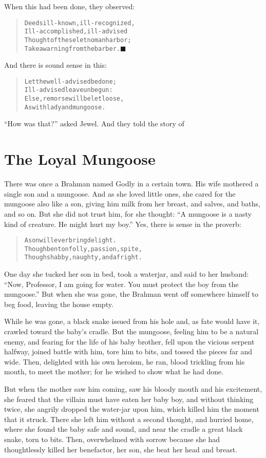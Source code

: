 \documentclass[article, twoside, 14pt]{memoir}
\newcommand{\qed}{\hfill \ensuremath{\blacksquare}}
\renewenvironment{verbatim}{%
\begin{quote}%
\vskip -10pt%
\begin{alltt}\normalfont\large}{\end{alltt}%
\end{quote}%
\vskip -10pt
} %
\begin{document}
When this had been done, they observed:

\begin{verbatim}
Deeds ill-known, ill-recognized,
Ill-accomplished, ill-advised{\textemdash}
Thought of these let no man harbor;
Take a warning from the barber.\hyperref[s79]{\qed}
\end{verbatim}
And there is sound sense in this:

\begin{verbatim}
Let the well-advised be done;
Ill-advised leave unbegun:
Else, remorse will be let loose,
As with lady and mungoose.
\end{verbatim}
``How was that?'' asked Jewel. And they told the story of

\chapter{The Loyal Mungoose}

\label{s80}

There was once a Brahman named Godly in a certain town. His wife
mothered a single son and a mungoose. And as she loved little ones,
she cared for the mungoose also like a son, giving him milk
from her breast, and salves, and baths, and so on. But she did not
trust him, for she thought:
``A mungoose is a nasty kind of creature. He might hurt my boy.''
Yes, there is sense in the proverb:

\begin{verbatim}
A son will ever bring delight.
Though bent on folly, passion, spite,
Though shabby, naughty, and a fright.
\end{verbatim}
One day she tucked her son in bed, took a waterjar, and said to her
husband:
``Now, Professor, I am going for water. You must protect the boy from the mungoose.''
But when she was gone, the Brahman went off somewhere himself to
beg food, leaving the house empty.

While he was gone, a black snake issued from his hole and, as fate
would have it, crawled toward the baby's cradle. But the mungoose,
feeling him to be a natural enemy, and fearing for the life of his
baby brother, fell upon the vicious serpent halfway, joined battle
with him, tore him to bits, and tossed the pieces far and wide.
Then, delighted with his own heroism, he ran, blood trickling from
his mouth, to meet the mother; for he wished to show what he had
done.

But when the mother saw him coming, saw his bloody mouth and his
excitement, she feared that the villain must have eaten her baby
boy, and without thinking twice, she angrily dropped the water-jar
upon him, which killed him the moment that it struck. There she
left him without a second thought, and hurried home, where she
found the baby safe and sound, and near the cradle a great black
snake, torn to bits. Then, overwhelmed with sorrow because she had
thoughtlessly killed her benefactor, her son, she beat her head and
breast.
\end{document}
